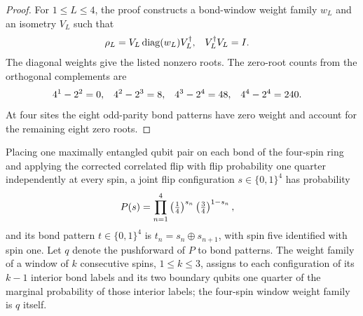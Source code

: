 \begin{proof}
    \leanok
    For $1\leq L\leq4$, the proof constructs a bond-window weight family
    $w_L$ and an isometry $V_L$ such that
    \begin{align}
        \rho_L & =V_L\operatorname{diag}(w_L)V_L^\dagger,
               & V_L^\dagger V_L                          & =I. \notag
    \end{align}
    The diagonal weights give the listed nonzero roots.  The zero-root counts
    from the orthogonal complements are
    \begin{align}
        4^1-2^2 & =0,
                & 4^2-2^3 & =8,
                & 4^3-2^4 & =48,
                & 4^4-2^4 & =240. \notag
    \end{align}
    At four sites the eight odd-parity bond patterns have zero weight and
    account for the remaining eight zero roots.
\end{proof}

\begin{definition}
    \label{def:cpsv_example410_correlated_flip_weights}
    \leanok
    Placing one maximally entangled qubit pair on each bond of the four-spin
    ring and applying the corrected correlated
    flip with flip probability one quarter independently at every spin, a joint flip configuration
    $s\in\{0,1\}^4$ has probability
    \begin{align}
        P(s) & =\prod_{n=1}^4\left(\tfrac14\right)^{s_n}
        \left(\tfrac34\right)^{1-s_n},
        \notag
    \end{align}
    and its bond pattern $t\in\{0,1\}^4$ is $t_n=s_n\oplus s_{n+1}$, with
    spin five identified with spin one.  Let $q$ denote the pushforward of
    $P$ to bond patterns.  The weight family of a window of $k$ consecutive
    spins, $1\le k\le 3$, assigns to each configuration of its $k-1$
    interior bond labels and its two boundary qubits one quarter of the
    marginal probability of those interior labels; the four-spin window
    weight family is $q$ itself.
\end{definition}

